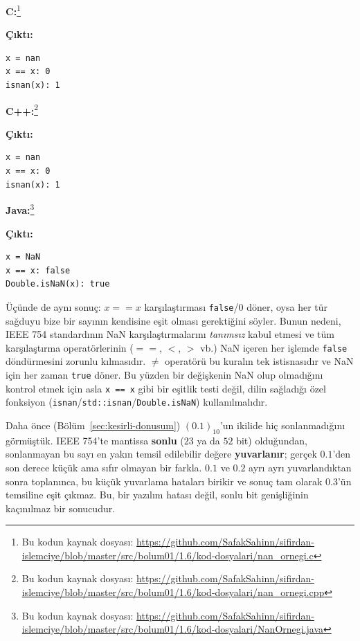 \textbf{C:}\footnote{Bu kodun kaynak dosyası:
\url{https://github.com/SafakSahinn/sifirdan-islemciye/blob/master/src/bolum01/1.6/kod-dosyalari/nan_ornegi.c}}

\noindent\textbf{Çıktı:}
\begin{lstlisting}[style=cikti]
x = nan
x == x: 0
isnan(x): 1
\end{lstlisting}

\textbf{C++:}\footnote{Bu kodun kaynak dosyası:
\url{https://github.com/SafakSahinn/sifirdan-islemciye/blob/master/src/bolum01/1.6/kod-dosyalari/nan_ornegi.cpp}}

\noindent\textbf{Çıktı:}
\begin{lstlisting}[style=cikti]
x = nan
x == x: 0
isnan(x): 1
\end{lstlisting}

\textbf{Java:}\footnote{Bu kodun kaynak dosyası:
\url{https://github.com/SafakSahinn/sifirdan-islemciye/blob/master/src/bolum01/1.6/kod-dosyalari/NanOrnegi.java}}

\noindent\textbf{Çıktı:}
\begin{lstlisting}[style=cikti]
x = NaN
x == x: false
Double.isNaN(x): true
\end{lstlisting}

Üçünde de aynı sonuç: $x==x$ karşılaştırması \texttt{false}/$0$ döner, oysa her tür sağduyu
bize bir sayının kendisine eşit olması gerektiğini söyler. Bunun nedeni, IEEE 754
standardının NaN karşılaştırmalarını \emph{tanımsız} kabul etmesi ve tüm karşılaştırma
operatörlerinin ($==$, $<$, $>$ vb.) NaN içeren her işlemde \texttt{false} döndürmesini
zorunlu kılmasıdır. $\neq$ operatörü bu kuralın tek istisnasıdır ve NaN için her zaman
\texttt{true} döner. Bu yüzden bir değişkenin NaN olup olmadığını kontrol etmek için asla
\texttt{x == x} gibi bir eşitlik testi değil, dilin sağladığı özel fonksiyon
(\texttt{isnan}/\texttt{std::isnan}/\texttt{Double.isNaN}) kullanılmalıdır.

\begin{bilginot}
Daha önce (Bölüm~\ref{sec:kesirli-donusum}) $(0.1)_{10}$'un ikilide hiç sonlanmadığını
görmüştük. IEEE 754'te mantissa \textbf{sonlu} ($23$ ya da $52$ bit) olduğundan, sonlanmayan
bu sayı en yakın temsil edilebilir değere \textbf{yuvarlanır}; gerçek $0.1$'den son derece
küçük ama sıfır olmayan bir farkla. $0.1$ ve $0.2$ ayrı ayrı yuvarlandıktan sonra toplanınca,
bu küçük yuvarlama hataları birikir ve sonuç tam olarak $0.3$'ün temsiline eşit çıkmaz. Bu,
bir yazılım hatası değil, sonlu bit genişliğinin kaçınılmaz bir sonucudur.
\end{bilginot}

